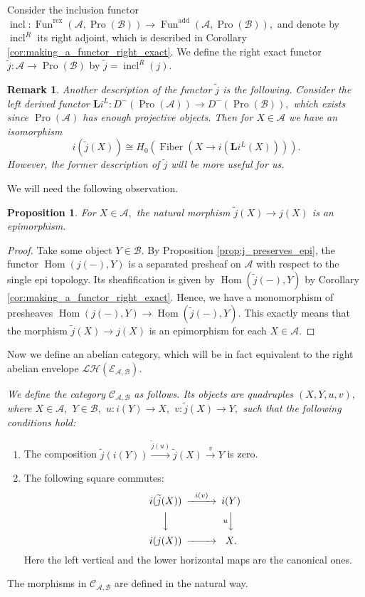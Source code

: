\documentclass[11pt,leqno]{amsart}
\newtheorem{prop}[theo]{Proposition}
\newtheorem{remark}[theo]{Remark}
\numberwithin{equation}{section}
\def\bL{\mathbb{L}}
\def\wt{\widetilde}
\def\bL{{\mathbf L}}
\def\Hom{\operatorname{Hom}}
\newcommand{\xto}{\xrightarrow}
\newcommand{\rex}{\operatorname{rex}}
\newcommand{\Fiber}{\operatorname{Fiber}}
\newcommand{\cL}{{\mathcal L}}
\newcommand{\cA}{{\mathcal A}}
\newcommand{\cB}{{\mathcal B}}
\newcommand{\cC}{{\mathcal C}}
\newcommand{\cE}{{\mathcal E}}
\newcommand{\cH}{{\mathcal H}}
\newcommand{\incl}{\operatorname{incl}}
\newcommand{\Fun}{\operatorname{Fun}}
\newcommand{\add}{\operatorname{add}}
\newcommand{\Pro}{\operatorname{Pro}}
\begin{document}
Consider the inclusion functor $\incl:\Fun^{\rex}(\cA,\Pro(\cB))\to \Fun^{\add}(\cA,\Pro(\cB)),$ and denote by $\incl^R$ its right adjoint, which is described in Corollary \ref{cor:making_a_functor_right_exact}. We define the right exact functor $\wt{j}:\cA\to \Pro(\cB)$ by $\wt{j}=\incl^R(j).$

\begin{remark}
Another description of the functor $\wt{j}$ is the following. Consider the left derived functor $\bL i^L:D^-(\Pro(\cA))\to D^-(\Pro(\cB)),$ which exists since $\Pro(\cA)$ has enough projective objects. Then for $X\in\cA$ we have an isomorphism
\begin{equation*}
i(\wt{j}(X))\cong H_0(\Fiber(X\to i(\bL i^L(X)))).
\end{equation*}
However, the former description of $\wt{j}$ will be more useful for us.
\end{remark}

We will need the following observation.

\begin{prop}\label{prop:j_tilde_to_j_is_epi}
For $X\in\cA,$ the natural morphism $\wt{j}(X)\to j(X)$ is an epimorphism.
\end{prop}

\begin{proof}
Take some object $Y\in \cB.$ By Proposition \ref{prop:j_preserves_epi}, the functor $\Hom(j(-),Y)$ is a separated presheaf on $\cA$ with respect to the single epi topology. Its sheafification is given by $\Hom(\wt{j}(-),Y)$ by Corollary \ref{cor:making_a_functor_right_exact}. Hence, we have a monomorphism of presheaves $\Hom(j(-),Y)\to \Hom(\wt{j}(-),Y).$ This exactly means that the morphism $\wt{j}(X)\to j(X)$ is an epimorphism for each $X\in\cA.$
\end{proof}

Now we define an abelian category, which will be in fact equivalent to the right abelian envelope $\cL\cH(\cE_{\cA,\cB}).$

{} {\it We define the category $\cC_{\cA,\cB}$ as follows. Its objects are quadruples $(X,Y,u,v),$ where $X\in\cA,$ $Y\in\cB,$ $u:i(Y)\to X,$ $v:\wt{j}(X)\to Y,$ such that the following conditions hold:
\begin{enumerate}[label=(\roman*),ref=(\roman*)]
	\item The composition $\wt{j}(i(Y))\xto{\wt{j}(u)}\wt{j}(X)\xto{v}Y$ is zero.
	\item The following square commutes:
	\begin{equation}\label{eq:comm_square_for_u_and_v}
		\begin{CD}
			i(\wt{j}(X)) @>{i(v)}>> i(Y)\\
			@VVV @V{u}VV\\
			i(j(X)) @>>> X.
		\end{CD}
	\end{equation}
	Here the left vertical and the lower horizontal maps are the canonical ones. 
\end{enumerate}
The morphisms in $\cC_{\cA,\cB}$ are defined in the natural way.}
\end{document}
